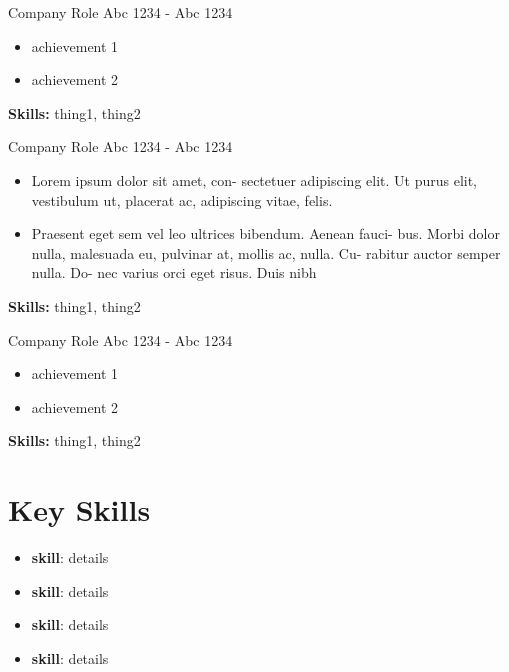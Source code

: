 \documentclass[9pt]{smart-cv}
\begin{document}
\begin{two-col}
    \begin{job}
      {Company}
      {Role}
      {Abc 1234 - Abc 1234}
      \begin{itemize}
        \item achievement 1
        \item achievement 2
      \end{itemize}
      \textbf{Skills:} thing1, thing2
    \end{job}

    \begin{job}
      {Company}
      {Role}
      {Abc 1234 - Abc 1234}
      \begin{itemize}
        \item Lorem ipsum dolor sit amet, con- sectetuer adipiscing elit. Ut
          purus elit, vestibulum ut, placerat ac, adipiscing vitae, felis.
        \item Praesent eget sem vel leo ultrices bibendum. Aenean fauci- bus.
          Morbi dolor nulla, malesuada eu, pulvinar at, mollis ac, nulla. Cu-
          rabitur auctor semper nulla. Do- nec varius orci eget risus. Duis
          nibh
      \end{itemize}
      \textbf{Skills:} thing1, thing2
    \end{job}
  \end{two-col}

  \pagebreak

  \begin{job}
    {Company}
    {Role}
    {Abc 1234 - Abc 1234}
    \begin{itemize}
      \item achievement 1
      \item achievement 2
    \end{itemize}
    \textbf{Skills:} thing1, thing2
  \end{job}

  \section{Key Skills}

  \begin{itemize}
    \item \textbf{skill}: details
    \item \textbf{skill}: details
    \item \textbf{skill}: details
    \item \textbf{skill}: details
  \end{itemize}
\end{document}
